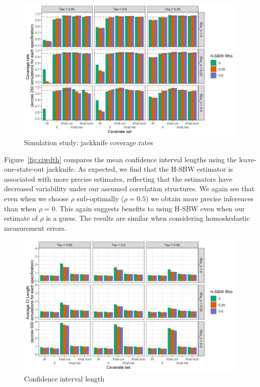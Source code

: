 \begin{figure}[H]
\begin{center}
    \caption{Simulation study: jackknife coverage rates}\label{fig:simcoverage1}
    \includegraphics[scale=0.5]{01_Plots/coverage-plot-1.png}
\end{center}
\end{figure}

Figure~\ref{fig:ciwdth} compares the mean confidence interval lengths using the leave-one-state-out jackknife. As expected, we find that the H-SBW estimator is associated with more precise estimates, reflecting that the estimators have decreased variability under our assumed correlation structures. We again see that even when we choose $\rho$ sub-optimally ($\rho = 0.5$) we obtain more precise inferences than when $\rho = 0$. This again suggests benefits to using H-SBW even when our estimate of $\rho$ is a guess. The results are similar when considering homoskedastic measurement errors. 

\begin{figure}[H]\label{fig:ciwidth}
\begin{center}
    \caption{Confidence interval length}\label{fig:simcoverage2}
    \includegraphics[scale=0.5]{01_Plots/ci-length-plot.png}
\end{center}
\end{figure}

